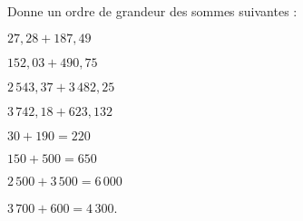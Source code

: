 Donne un ordre de grandeur des sommes suivantes :
\begin{multicols}{2}
\begin{myenumerate}
\item $27,28+187,49$
\item $152,03+490,75$
\item $2\,543,37+3\,482,25$
\item $3\,742,18+623,132$
\end{myenumerate}
\end{multicols}
\begin{multicols}{2}
  \begin{myenumerate}
    \item $30+190=220$
    \item $150+500=650$
    \item $2\,500+3\,500=6\,000$
    \item $3\,700+600=4\,300$.
  \end{myenumerate}
\end{multicols}
